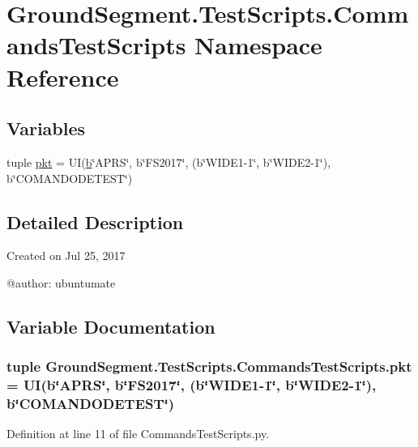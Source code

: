 \hypertarget{namespace_ground_segment_1_1_test_scripts_1_1_commands_test_scripts}{}\section{Ground\+Segment.\+Test\+Scripts.\+Commands\+Test\+Scripts Namespace Reference}
\label{namespace_ground_segment_1_1_test_scripts_1_1_commands_test_scripts}
\subsection*{Variables}
\begin{DoxyCompactItemize}
\item 
tuple \hyperlink{namespace_ground_segment_1_1_test_scripts_1_1_commands_test_scripts_a63ec65c414a5cee4d1d6d3bc3b92f2a5}{pkt} = U\+I(\hyperlink{bootstrap_8min_8js_a398bb8542498d1b14178b02b99df309b}{b}\char`\"{}A\+P\+R\+S\char`\"{}, b\char`\"{}F\+S2017\char`\"{}, (b\char`\"{}W\+I\+D\+E1-\/1\char`\"{}, b\char`\"{}W\+I\+D\+E2-\/1\char`\"{}), b\char`\"{}C\+O\+M\+A\+N\+D\+O\+D\+E\+T\+E\+S\+T\char`\"{})
\end{DoxyCompactItemize}


\subsection{Detailed Description}
\begin{DoxyVerb}Created on Jul 25, 2017

@author: ubuntumate
\end{DoxyVerb}
 

\subsection{Variable Documentation}
\hypertarget{namespace_ground_segment_1_1_test_scripts_1_1_commands_test_scripts_a63ec65c414a5cee4d1d6d3bc3b92f2a5}{}
\subsubsection[{pkt}]{\setlength{\rightskip}{0pt plus 5cm}tuple Ground\+Segment.\+Test\+Scripts.\+Commands\+Test\+Scripts.\+pkt = U\+I({\bf b}\char`\"{}A\+P\+R\+S\char`\"{}, b\char`\"{}F\+S2017\char`\"{}, (b\char`\"{}W\+I\+D\+E1-\/1\char`\"{}, b\char`\"{}W\+I\+D\+E2-\/1\char`\"{}), b\char`\"{}C\+O\+M\+A\+N\+D\+O\+D\+E\+T\+E\+S\+T\char`\"{})}\label{namespace_ground_segment_1_1_test_scripts_1_1_commands_test_scripts_a63ec65c414a5cee4d1d6d3bc3b92f2a5}


Definition at line 11 of file Commands\+Test\+Scripts.\+py.

